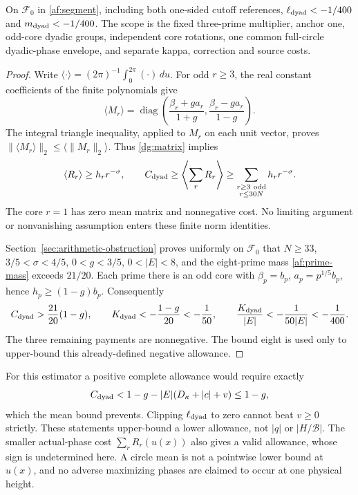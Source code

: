 \begin{theorem}
On $\mathcal F_0$ in \eqref{af:segment}, including both one-sided cutoff
references, $\ell_{\rm dyad}<-1/400$ and $m_{\rm dyad}<-1/400$.
The scope is the fixed three-prime multiplier, anchor one, odd-core
dyadic groups, independent core rotations, one common full-circle
dyadic-phase envelope, and separate kappa, correction and source costs.
\end{theorem}

\begin{proof}
Write $\langle\cdot\rangle=(2\pi)^{-1}\int_0^{2\pi}(\cdot)\,du$.
For odd $r\ge3$, the real constant coefficients of the finite
polynomials give
\[
 \langle M_r\rangle=\operatorname{diag}
 \left(\frac{\beta_r+ga_r}{1+g},
       \frac{\beta_r-ga_r}{1-g}\right).
\]
The integral triangle inequality, applied to $M_r$ on each unit vector,
proves $\|\langle M_r\rangle\|_2\le\langle\|M_r\|_2\rangle$.
Thus \eqref{dg:matrix} implies
\[
 \langle R_r\rangle\ge h_r r^{-\sigma},\qquad
 C_{\rm dyad}\ge\left\langle\sum_rR_r\right\rangle
 \ge\sum_{\substack{r\ge3\ {\rm odd}\\r\le30N}}h_r r^{-\sigma}.
\]
The core $r=1$ has zero mean matrix and nonnegative cost. No limiting
argument or nonvanishing assumption enters these finite norm identities.

Section~\ref{sec:arithmetic-obstruction} proves uniformly on
$\mathcal F_0$ that $N\ge33$, $3/5<\sigma<4/5$, $0<g<3/5$,
$0<|E|<8$, and the eight-prime mass \eqref{af:prime-mass} exceeds
$21/20$. Each prime there is an odd core with
$\beta_p=b_p$, $a_p=p^{1/5}b_p$, hence $h_p\ge(1-g)b_p$.
Consequently
\[
 C_{\rm dyad}>\frac{21}{20}(1-g),\qquad
 K_{\rm dyad}<-\frac{1-g}{20}<-\frac1{50},\qquad
 \frac{K_{\rm dyad}}{|E|}<-\frac1{50|E|}<-\frac1{400}.
\]
The three remaining payments are nonnegative. The bound eight is used
only to upper-bound this already-defined negative allowance.
\end{proof}

For this estimator a positive complete allowance would require exactly
\[
 C_{\rm dyad}<1-g-|E|(D_\kappa+|c|+v)\le1-g,
\]
which the mean bound prevents. Clipping $\ell_{\rm dyad}$ to zero
cannot beat $v\ge0$ strictly. These statements upper-bound a lower
allowance, not $|q|$ or $|H/\mathcal B|$.
The smaller actual-phase cost $\sum_rR_r(u(x))$ also gives a valid
allowance, whose sign is undetermined here. A circle mean is not a
pointwise lower bound at $u(x)$, and no adverse maximizing phases are
claimed to occur at one physical height.

